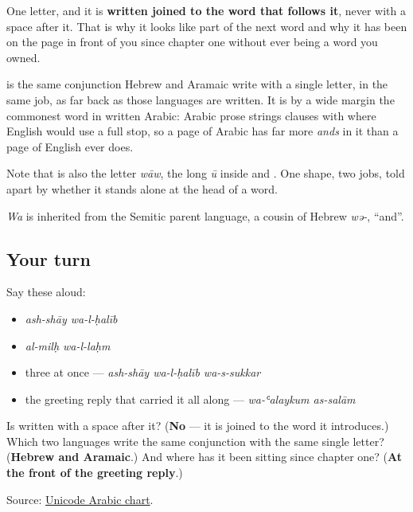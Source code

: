 One letter, and it is \textbf{written joined to the word that follows it}, never with a space after it. That is why it looks like part of the next word and why it has been on the page in front of you since chapter one without ever being a word you owned.

\begin{cousinweb}
\textbf{} is the same conjunction Hebrew and Aramaic write with a single letter, in the same job, as far back as those languages are written. It is by a wide margin the commonest word in written Arabic: Arabic prose strings clauses with \textbf{} where English would use a full stop, so a page of Arabic has far more \emph{ands} in it than a page of English ever does.

Note that \textbf{} is also the letter \emph{wāw}, the long \emph{ū} inside \textbf{} and \textbf{}. One shape, two jobs, told apart by whether it stands alone at the head of a word.

\emph{Wa} is inherited from the Semitic parent language, a cousin of Hebrew \emph{wə-}, \textquotedblleft{}and\textquotedblright{}.
\end{cousinweb}

\subsection*{Your turn}
Say these aloud:

\begin{itemize}
\raggedright
  \item \emph{ash-shāy wa-l-ḥalīb}
  \item \emph{al-milḥ wa-l-laḥm}
  \item three at once — \emph{ash-shāy wa-l-ḥalīb wa-s-sukkar}
  \item the greeting reply that carried it all along — \emph{wa-ʿalaykum as-salām}
\end{itemize}

\begin{tcolorbox}[breakable,colback=teal!4,colframe=teal!35!black,title={Before you move on}]
Is \textbf{} written with a space after it? (\textbf{No} — it is joined to the word it introduces.) Which two languages write the same conjunction with the same single letter? (\textbf{Hebrew and Aramaic}.) And where has it been sitting since chapter one? (\textbf{At the front of the greeting reply}.)

Source: \href{https://www.unicode.org/charts/PDF/U0600.pdf}{Unicode Arabic chart}.
\end{tcolorbox}
